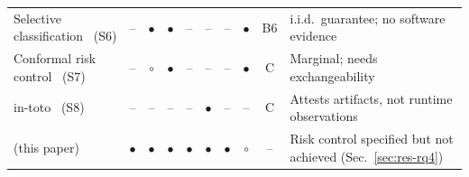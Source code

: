 \begin{table}[!t]
\begin{tabular}{|L{3.25cm}|c|c|c|c|c|c|c|c|L{3.35cm}|}
Selective classification~\cite{geifman2017selective} (S6) & -- & $\bullet$ & $\bullet$ & -- & -- & -- & $\bullet$ & B6 & i.i.d.\ guarantee; no software evidence \\
Conformal risk control~\cite{angelopoulos2024conformal} (S7) & -- & $\circ$ & $\bullet$ & -- & -- & -- & $\bullet$ & C & Marginal; needs exchangeability \\
in-toto~\cite{torresarias2019intoto} (S8) & -- & -- & -- & -- & $\bullet$ & -- & -- & C & Attests artifacts, not runtime observations \\
\hline
\sbg{} (this paper) & $\bullet$ & $\bullet$ & $\bullet$ & $\bullet$ & $\bullet$ & $\bullet$ & $\circ$ & -- & Risk control specified but not achieved (Sec.~\ref{sec:res-rq4}) \\
\hline
\end{tabular}
\end{table}
